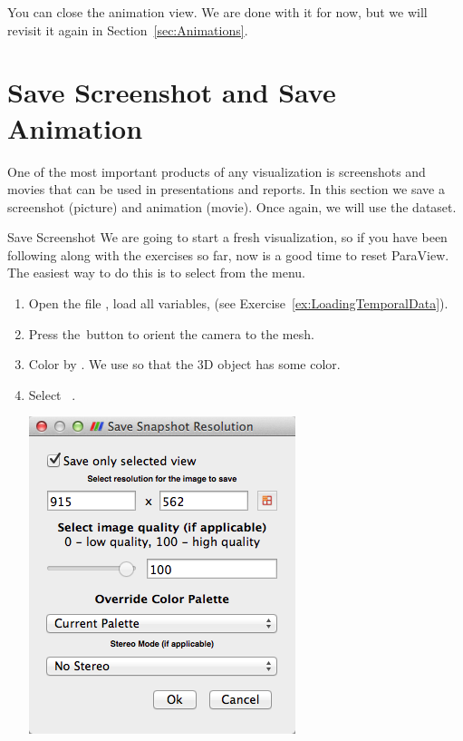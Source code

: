 You can close the animation view. We are done with it for now, but we will
revisit it again in Section~\ref{sec:Animations}.


\section{Save Screenshot and Save Animation}
\label{sec:SaveScreenshot}

One of the most important products of any visualization is screenshots and 
movies that can be used in presentations and reports.  In this section we 
save a screenshot (picture) and animation (movie). Once again, we
will use the  dataset.


\begin{exercise}{Save Screenshot}
  \label{ex:SaveScreenshot}%
  We are going to start a fresh visualization, so if you have been
  following along with the exercises so far, now is a good time to reset
  ParaView.  The easiest way to do this is to select  \ra
   from the menu.

  \begin{enumerate}
  \item Open the file , load all variables, \apply (see
    Exercise~\ref{ex:LoadingTemporalData}).
  \item Press the~\yPlus button to orient the camera to the mesh.
  \item Color by .  We use  so that the
    3D object has some color.
  \item Select  \ra {}~.

  \begin{inlinefig}
    \includegraphics[width=.8\scw]{images/SaveScreenshot1}
  \end{inlinefig}


\end{enumerate}
\end{exercise}
